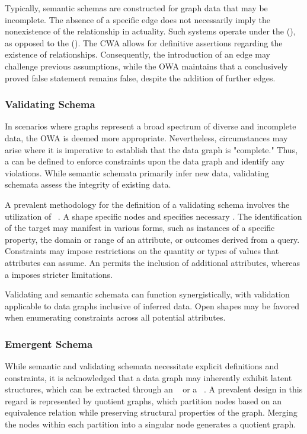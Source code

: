 Typically, semantic schemas are constructed for graph data that may be incomplete. The absence of a specific edge does not necessarily imply the nonexistence of the relationship in actuality. Such systems operate under the  (), as opposed to the  (). The CWA allows for definitive assertions regarding the existence of relationships. Consequently, the introduction of an edge may challenge previous assumptions, while the OWA maintains that a conclusively proved false statement remains false, despite the addition of further edges.



\subsubsection{Validating Schema}
In scenarios where graphs represent a broad spectrum of diverse and incomplete data, the OWA is deemed more appropriate. Nevertheless, circumstances may arise where it is imperative to establish that the data graph is "complete." Thus, a  can be defined to enforce constraints upon the data graph and identify any violations. While semantic schemata primarily infer new data, validating schemata assess the integrity of existing data.

A prevalent methodology for the definition of a validating schema involves the utilization of ~\cite{Knublauch2017SHACL, LabraGayo2017ValidatingRDF, Prudhommeaux2014ShapeExpressions}. A shape  specific nodes and specifies necessary . The identification of the target may manifest in various forms, such as instances of a specific property, the domain or range of an attribute, or outcomes derived from a query. Constraints may impose restrictions on the quantity or types of values that attributes can assume. An  permits the inclusion of additional attributes, whereas a  imposes stricter limitations.

Validating and semantic schemata can function synergistically, with validation applicable to data graphs inclusive of inferred data. Open shapes may be favored when enumerating constraints across all potential attributes.

\subsubsection{Emergent Schema}
While semantic and validating schemata necessitate explicit definitions and constraints, it is acknowledged that a data graph may inherently exhibit latent structures, which can be extracted through an ~\cite{Pham2015EmergenSchemaFromRDF} or a ~\cite{Cebiric2019SummarizingSemanticGraphs, Liu2018GraphuSummarizationMethodsAndApplications, Spahiu2016ABSTAT}. A prevalent design in this regard is represented by quotient graphs, which partition nodes based on an equivalence relation while preserving structural properties of the graph. Merging the nodes within each partition into a singular node generates a quotient graph.

